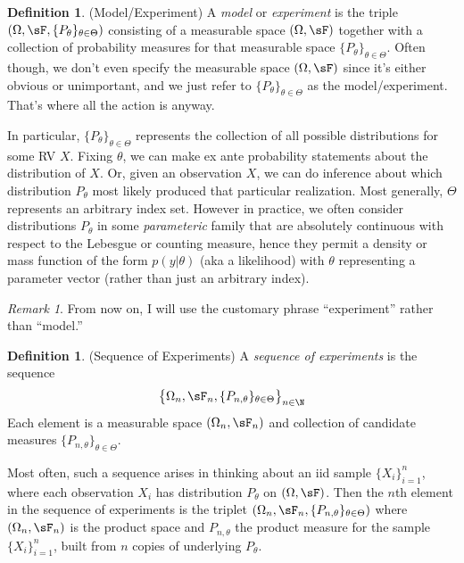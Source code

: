 \documentclass[12pt]{article}
\theoremstyle{plain}
\theoremstyle{definition}
\newtheorem{defn}[thm]{Definition}
\theoremstyle{remark}
\newtheorem*{rmk}{Remark}
\begin{document}
\begin{defn}(Model/Experiment)
A \emph{model} or \emph{experiment} is the triple
$(\Omega,\sF,\{P_\theta\}_{\theta\in  \Theta})$ consisting of a measurable space
$(\Omega,\sF)$ together with a collection of probability measures for
that measurable space $\{P_\theta\}_{\theta\in  \Theta}$.
Often though, we don't even specify the measurable space $(\Omega,\sF)$
since it's either obvious or unimportant, and we just refer to
$\{P_\theta\}_{\theta\in  \Theta}$ as the model/experiment. That's where
all the action is anyway.

In particular, $\{P_\theta\}_{\theta\in  \Theta}$ represents the collection of all
possible distributions for some RV $X$.
Fixing $\theta$, we can make ex ante probability statements about the
distribution of $X$. Or, given an observation $X$, we can do inference
about which distribution $P_\theta$ most likely produced that particular
realization.
Most generally, $ \Theta$ represents an arbitrary index set.
However in practice, we often consider distributions $P_\theta$ in some
\emph{parameteric} family that are absolutely continuous with respect to
the Lebesgue or counting measure, hence they permit a density or mass
function of the form $p(y|\theta)$ (aka a likelihood) with $\theta$ representing a
parameter vector (rather than just an arbitrary index).
\end{defn}
\begin{rmk}
From now on, I will use the customary phrase ``experiment'' rather than
``model.''
\end{rmk}

\begin{defn}(Sequence of Experiments)
A \emph{sequence of experiments} is the sequence
\begin{align*}
  \big\{\Omega_n,\sF_n,\{P_{n,\theta}\}_{\theta\in  \Theta}
  \big\}_{n\in \N}
\end{align*}
Each element is a measurable space $(\Omega_n,\sF_n)$ and
collection of candidate measures $\{P_{n,\theta}\}_{\theta\in  \Theta}$.

Most often, such a sequence arises in thinking about an iid sample
$\{X_i\}_{i=1}^n$, where each observation $X_i$ has distribution $P_\theta$
on $(\Omega,\sF)$.
Then the $n$th element in the sequence of experiments is the
triplet $(\Omega_n,\sF_n,\{P_{n,\theta}\}_{\theta\in  \Theta})$ where
$(\Omega_n,\sF_n)$ is the product space and $P_{n,\theta}$ the product
measure for the sample $\{X_i\}_{i=1}^n$, built from $n$ copies of
underlying $P_\theta$.
\end{defn}
\end{document}
